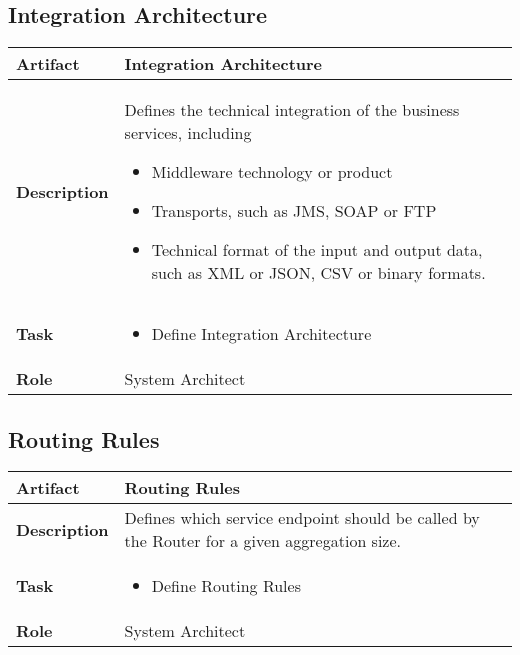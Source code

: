 \subsection{Integration Architecture}

\begin{tabularx}{\textwidth}{@{} l X @{}}
	\caption{Integration Architecture} \label{table:ch6_Artifact_Integration_Architecture}\\
	\toprule 
	\bfseries Artifact & Integration Architecture\\
	\midrule 
	\bfseries Description & Defines the technical integration of the business services, including
	\begin{itemize}
		\item Middleware technology or product
		\item Transports, such as \ac{JMS}, \ac{SOAP} or \ac{FTP}
		\item Technical format of the input and output data, such as \ac{XML} or \ac{JSON}, \ac{CSV} or binary formats.
	\end{itemize}
	\\
	\midrule 
	\bfseries Task & 
	\begin{itemize}
		\item Define Integration Architecture 
	\end{itemize}
	\\
	\midrule 
	\bfseries Role & System Architect\\
	\bottomrule 
\end{tabularx}


\subsection{Routing Rules}

\begin{tabularx}{\textwidth}{@{} l X @{}}
	\caption{Routing Rules} \label{table:ch6_Artifact_Routing_Rules}\\
	\toprule 
	\bfseries Artifact & Routing Rules\\
	\midrule 
	\bfseries Description & Defines which service endpoint should be called by the Router for a given aggregation size.\\
	\midrule 
	\bfseries Task & 
	\begin{itemize}
		\item Define Routing Rules
	\end{itemize}
	\\
	\midrule 
	\bfseries Role & System Architect\\
	\bottomrule 
\end{tabularx}


